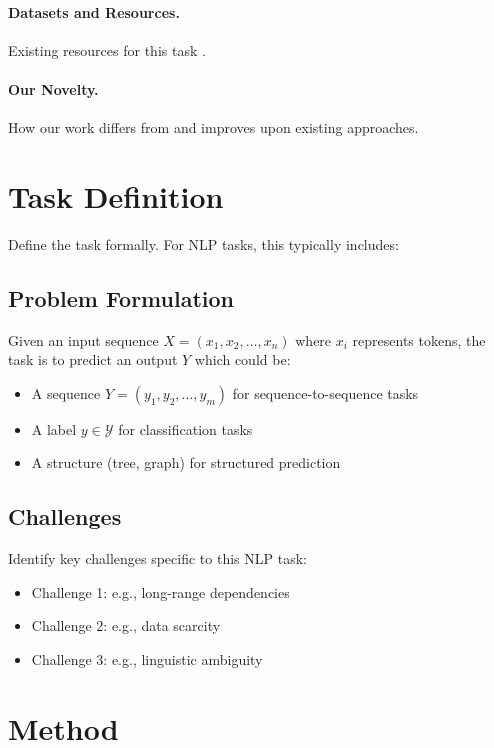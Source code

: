 \documentclass[11pt]{article}
\begin{document}
\paragraph{Datasets and Resources.} Existing resources for this task \cite{dataset2021}.

\paragraph{Our Novelty.} How our work differs from and improves upon existing approaches.

\section{Task Definition}
\label{sec:task}

Define the task formally. For NLP tasks, this typically includes:

\subsection{Problem Formulation}

Given an input sequence $X = (x_1, x_2, \ldots, x_n)$ where $x_i$ represents tokens,
the task is to predict an output $Y$ which could be:
\begin{itemize}
    \item A sequence $Y = (y_1, y_2, \ldots, y_m)$ for sequence-to-sequence tasks
    \item A label $y \in \mathcal{Y}$ for classification tasks
    \item A structure (tree, graph) for structured prediction
\end{itemize}

\subsection{Challenges}

Identify key challenges specific to this NLP task:
\begin{itemize}
    \item Challenge 1: e.g., long-range dependencies
    \item Challenge 2: e.g., data scarcity
    \item Challenge 3: e.g., linguistic ambiguity
\end{itemize}

\section{Method}
\label{sec:method}
\end{document}
